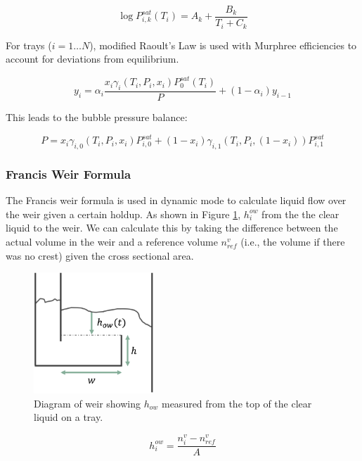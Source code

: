 \begin{equation}
    \log P_{i,k}^{sat}(T_i) = A_k + \frac{B_k}{T_i + C_k}
\end{equation}

For trays ($i=1\dots N$), modified Raoult’s Law is used with Murphree efficiencies to account for deviations from equilibrium.

\begin{equation}
    y_i = \alpha_i\frac{x_i\gamma_i(T_i, P_i, x_i)P_0^{sat}(T_i)}{P} + (1-\alpha_i)y_{i-1}
\end{equation}

This leads to the bubble pressure balance:

\begin{equation}
    P = x_i\gamma_{i,0}(T_i, P_i, x_i)P^{sat}_{i,0} + (1-x_i)\gamma_{i,1}(T_i, P_i, (1-x_i))P^{sat}_{i,1}
\end{equation}

\subsubsection{Francis Weir Formula}

The Francis weir formula is used in dynamic mode to calculate liquid flow over the weir given a certain holdup. As shown in Figure \ref{fig:weir}, $h_i^{ow}$ from the the clear liquid to the weir. We can calculate this by taking the difference between the actual volume in the weir and a reference volume $n^v_{ref}$ (i.e., the volume if there was no crest) given the cross sectional area.

\begin{figure}
    \centering
    \includegraphics[width=0.4\textwidth]{gfx/Chapter06/weir.png}
    \caption{Diagram of weir showing $h_{ow}$ measured from the top of the clear liquid on a tray.}
    \label{fig:weir}
\end{figure}


\begin{equation}
    h^{ow}_i = \frac{n^v_i-n^v_{ref}}{A}
\end{equation}

